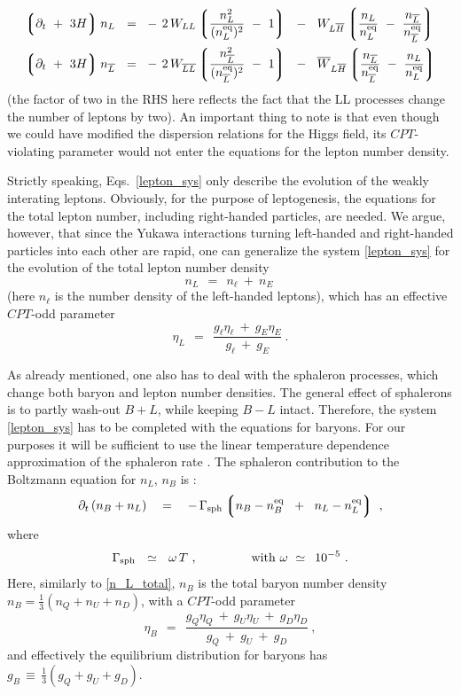 \documentclass[12pt]{revtex4}
\newcommand{\eq}{{\rm eq}}
\newcommand{\lgr}{\left\lgroup}
\newcommand{\rgr}{\right\rgroup}
\newcommand{\Gsph}{\Gamma_{\rm sph}}
\newcommand{\p}{\partial}
\newcommand{\ov}{\overline}
\begin{document}
\begin{equation}
\label{lepton_sys}
\begin{split}
	\lgr \p_t ~+~ 3H \rgr 
		n_L ~~=~~ &
	-\, 2\, W_{LL} \lgr \frac{n_L^2}{(n_L^\eq)^2} ~-~ 1 \rgr
	~~-~~
	W_{L\ov{H}} \lgr \frac{n_L}{n_L^\eq} ~-~ 
			\frac{n_{\ov{L}}}{n_{\ov{L}}^\eq} \rgr  \\
	\lgr \p_t ~+~ 3H \rgr 
		n_{\ov{L}} ~~=~~ &
	-\, 2\, W_{\ov{LL}} \lgr 
		\frac{n_{\ov{L}}^2}{(n_{\ov{L}}^\eq)^2} ~-~ 1 \rgr
	~~-~~
	\ov{W}_{L\ov{H}} \lgr \frac{n_{\ov{L}}}{n_{\ov{L}}^\eq} ~-~ 
			\frac{n_L}{n_L^\eq} \rgr  \\
\end{split}
\end{equation}
	(the factor of two in the RHS here reflects the fact 
	that the LL processes change the number of leptons by two).
	An important thing to note is that even though we could have 
	modified the dispersion relations for the Higgs field, 
	its $CPT$-violating parameter would not enter the equations for the lepton number
	density.

	Strictly speaking, Eqs.~\eqref{lepton_sys} only describe the evolution
	of the weakly interating leptons. 
	Obviously, for the purpose of leptogenesis, the equations for the total
	lepton number, including right-handed particles, are needed.
	We argue, however, that since the Yukawa interactions turning left-handed
	and right-handed particles into each other are rapid, 
	one can generalize the system \eqref{lepton_sys} for the 
	evolution of the total lepton number density 
\begin{equation}
\label{n_L_total}
	n_L  ~~=~~ n_\ell ~+~ n_E~
\end{equation}
	(here $ n_\ell $ is the number density of the left-handed leptons),
	which has an effective $ CPT $-odd parameter 
\[
	\eta_L ~~=~~ \frac{ g_\ell \eta_\ell ~+~ g_E \eta_E } { g_\ell ~+~ g_E }~.
\]

	As already mentioned,
	one also has to deal with the sphaleron processes, which change
	both baryon and lepton number densities.
	The general effect of sphalerons is to partly wash-out $ B + L $,
	while keeping $ B - L $ intact.
	Therefore, the system \eqref{lepton_sys} has to be completed with
	the equations for baryons.
	For our purposes it will be sufficient to use the linear
	temperature dependence approximation of the sphaleron rate
\cite{Kuzmin:1985mm,Khlebnikov:1988sr}. 
	The sphaleron contribution to the Boltzmann equation
	for $ n_L $, $ n_B $ is 
\cite{Kuzmin:1985mm,Moore:2000mx,Moore:2000ar}:
\begin{equation}
\label{sph_corr}
	\p_t\, (n_B + n_L)
	~~~=~~~ -\, \Gsph 
		\lgr   n_B - n_B^\eq \;~+~\;
		       n_L - n_L^\eq 
		\rgr~,
\end{equation}
	where
\[
	\Gsph ~~\simeq~~ \omega\, T~, \qquad\qquad 
	{\rm ~with~}
	\omega ~\simeq~ \,10^{-5}~.
\]
	Here, similarly to \eqref{n_L_total}, $ n_B $ is the total baryon number density
	$ n_B = \frac{1}{3}(n_Q + n_U + n_D) $, with a $ CPT $-odd parameter
\[
	\eta_B ~~=~~ \frac{g_Q \eta_Q ~+~ g_U \eta_U ~+~ g_D \eta_D} 
			    {g_Q ~+~ g_U ~+~ g_D}~,
\]
	and effectively the equilibrium distribution for baryons has 
	$ g_B \,\equiv\, \frac{1}{3}(g_Q + g_U + g_D) $.
	
\end{document}
